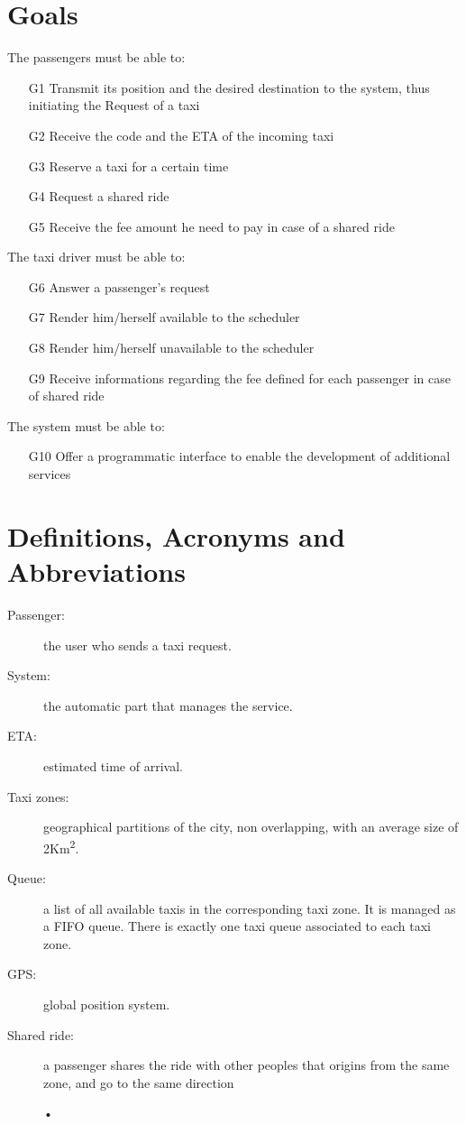 \documentclass[a4paper,11pt]{report}
\begin{document}
\section{Goals}
The passengers must be able to:
\begin{itemize}
  \item [G1] Transmit its position and the desired destination to the system, thus initiating the Request of a taxi
  \item [G2] Receive the code and the ETA of the incoming taxi
  \item [G3] Reserve a taxi for a certain time  %
  \item [G4] Request a shared ride
  \item [G5] Receive the fee amount he need to pay in case of a shared ride
\end{itemize}
The taxi driver must be able to:
\begin{itemize}
  \item [G6] Answer a passenger's request
  \item [G7] Render him/herself available to the scheduler
  \item [G8] Render him/herself unavailable to the scheduler
  \item [G9] Receive informations regarding the fee defined for each passenger in case of shared ride
\end{itemize}
The system must be able to:
\begin{itemize}
  \item [G10] Offer a programmatic interface to enable the development of additional services
\end{itemize}
\section{Definitions, Acronyms and Abbreviations}
\begin{description}
  \item[Passenger:] the user who sends a taxi request.
  \item[System:] the automatic part that manages the service.  %
  \item[ETA:] estimated time of arrival.
  \item[Taxi zones:] geographical partitions of the city, non overlapping, with an average size of 2Km\textsuperscript{2}.
  \item[Queue:] a list of all available taxis in the corresponding taxi zone. It is managed as a FIFO queue.
    There is exactly one taxi queue associated to each taxi zone.
  \item[GPS:] global position system.
  \item[Shared ride:] a passenger shares the ride with other peoples that origins from the same zone, and go to the same direction
    \begin{center}
    •
    \end{center}
\end{description}
 
\end{document}
